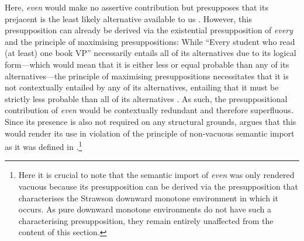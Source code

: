 \xe
Here, \textit{even} would make no assertive contribution but presupposes that its prejacent is the least likely alternative available to us \parencite{Karttunen1979,Kay1990}. However, this presupposition can already be derived via the existential presupposition of \textit{every} and the principle of maximising presuppositions: While \enquote{Every student who read (at least) one book VP} necessarily entails all of its alternatives due to its logical form---which would mean that it is either less or equal probable than any of its alternatives---the principle of maximising presuppositions necessitates that it is not contextually entailed by any of its alternatives, entailing that it must be strictly less probable than all of its alternatives \parencite{Kolmogorov1933}. As such, the presuppositional contribution of \textit{even} would be contextually redundant and therefore superfluous. Since its presence is also not required on any structural grounds, \textcite{Crnic2014-dogma} argues that this would render its use in violation of the principle of non-vacuous semantic import as it was defined in .\footnote{Here it is crucial to note that the semantic import of \textit{even} was only rendered vacuous because its presupposition can be derived via the presupposition that characterises the Strawson downward monotone environment in which it occurs. As pure downward monotone environments do not have such a characterising presupposition, they remain entirely unaffected from the content of this section.}

